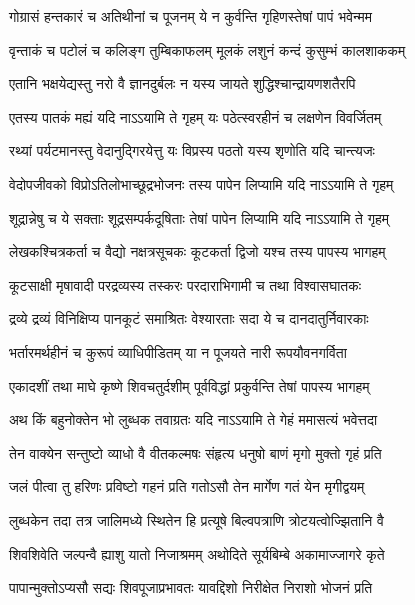 \twolineshloka
{गोग्रासं हन्तकारं च अतिथीनां च पूजनम्}
{ये न कुर्वन्ति गृहिणस्तेषां पापं भवेन्मम}%

\twolineshloka
{वृन्ताकं च पटोलं च कलिङ्ग तुम्बिकाफलम्}
{मूलकं लशुनं कन्दं कुसुम्भं कालशाककम्}%

\twolineshloka
{एतानि भक्षयेद्यस्तु नरो वै ज्ञानदुर्बलः}
{न यस्य जायते शुद्धिश्चान्द्रायणशतैरपि}%

\twolineshloka
{एतस्य पातकं मह्यं यदि नाऽऽयामि ते गृहम्}
{यः पठेत्स्वरहीनं च लक्षणेन विवर्जितम्}%

\twolineshloka
{रथ्यां पर्यटमानस्तु वेदानुद्गिरयेत्तु यः}
{विप्रस्य पठतो यस्य शृणोति यदि चान्त्यजः}%

\twolineshloka
{वेदोपजीवको विप्रोऽतिलोभाच्छूद्रभोजनः}
{तस्य पापेन लिप्यामि यदि नाऽऽयामि ते गृहम्}%

\twolineshloka
{शूद्रान्नेषु च ये सक्ताः शूद्रसम्पर्कदूषिताः}
{तेषां पापेन लिप्यामि यदि नाऽऽयामि ते गृहम्}%

\twolineshloka
{लेखकश्चित्रकर्ता च वैद्यो नक्षत्रसूचकः}
{कूटकर्ता द्विजो यश्च तस्य पापस्य भागहम्}%

\twolineshloka
{कूटसाक्षी मृषावादी परद्रव्यस्य तस्करः}
{परदाराभिगामी च तथा विश्वासघातकः}%

\twolineshloka
{द्रव्ये द्रव्यं विनिक्षिप्य पानकूटं समाश्रितः}
{वेश्यारताः सदा ये च दानदातुर्निवारकाः}%

\twolineshloka
{भर्तारमर्थहीनं च कुरूपं व्याधिपीडितम्}
{या न पूजयते नारी रूपयौवनगर्विता}%

\twolineshloka
{एकादशीं तथा माघे कृष्णे शिवचतुर्दशीम्}
{पूर्वविद्धां प्रकुर्वन्ति तेषां पापस्य भागहम्}%

\twolineshloka
{अथ किं बहुनोक्तेन भो लुब्धक तवाग्रतः}
{यदि नाऽऽयामि ते गेहं ममासत्यं भवेत्तदा}%

\twolineshloka
{तेन वाक्येन सन्तुष्टो व्याधो वै वीतकल्मषः}
{संहृत्य धनुषो बाणं मृगो मुक्तो गृहं प्रति}%

\twolineshloka
{जलं पीत्वा तु हरिणः प्रविष्टो गहनं प्रति}
{गतोऽसौ तेन मार्गेण गतं येन मृगीद्वयम्}%

\twolineshloka
{लुब्धकेन तदा तत्र जालिमध्ये स्थितेन हि}
{प्रत्यूषे बिल्वपत्राणि त्रोटयत्वोज्झितानि वै}%

\twolineshloka
{शिवशिवेति जल्पन्वै ह्याशु यातो निजाश्रमम्}
{अथोदिते सूर्यबिम्बे अकामाज्जागरे कृते}%

\twolineshloka
{पापान्मुक्तोऽप्यसौ सद्यः शिवपूजाप्रभावतः}
{यावद्दिशो निरीक्षेत निराशो भोजनं प्रति}%

